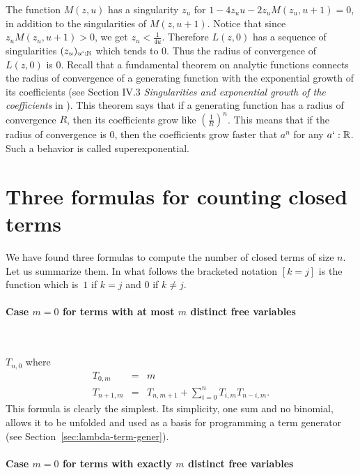 \documentclass{jfp1}
\newcommand{\nat}{\ensuremath{\mathbb{N}}}
\begin{document}
The function $M(z,u)$ has a singularity $z_u$ for $1-4z_u u - 2z_u M(z_u,u+1) = 0$, in addition to
the singularities of $M(z,u+1)$.  Notice that since $z_u M(z_u,u+1)>0$, we get $z_u<\frac{1}{4u}$.  Therefore
$L(z,0)$ has a sequence of singularities $(z_u)_{u`:\nat}$ which tends to $0$.  Thus
the radius of convergence of $L(z,0)$ is 0.  Recall that a fundamental theorem on analytic
functions connects the radius of convergence of a generating function with the
exponential growth of its coefficients (see Section IV.3 \emph{Singularities and
  exponential growth of the coefficients} in 
\fi).  This theorem says that if a generating
function has a radius of convergence $R$, then its coefficients grow like
$\left(\frac{1}{R}\right)^n$.  This means that if the radius of convergence is $0$,
then the coefficients grow faster that $a^n$ for any $a`:\ensuremath{\mathbb{R}}$.
Such a behavior is called superexponential. 


\section{Three formulas for counting closed terms}
\label{sec:three-formulas}

We have found three formulas to compute the number of closed terms of size $n$.  Let
us summarize them.  In what follows the bracketed notation $[k=j]$ is the function
which is~$1$ if $k=j$ and $0$ if $k\neq j$.

\paragraph{Case $m=0$ for terms with at most $m$ distinct free variables}~
\label{sec:case_atmost}

$T_{n,0}$ where
\begin{eqnarray*}
 T_{0,m} &=& m\\
 T_{n+1,m} & =& T_{n,m+1} + \sum_{i=0}^{n} T_{i,m} T_{n-i,m}.
\end{eqnarray*}
This formula is clearly the simplest.  Its simplicity, one sum and no binomial,
allows it to be unfolded and used as a basis for programming a term generator (see
Section~\ref{sec:lambda-term-gener}).

\paragraph{Case $m=0$ for terms with exactly $m$ distinct free variables}~
\label{sec:case_exactly}
\end{document}
